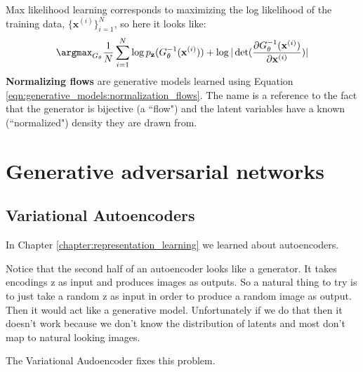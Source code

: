 Max likelihood learning corresponds to maximizing the log likelihood of the training data, $\{\mathbf{x}^{(i)}\}_{i=1}^N$, so here it looks like:
\begin{equation}
    \argmax_{G_{\theta}} \frac{1}{N} \sum_{i=1}^N \log p_{\mathbf{z}}(G_{\theta}^{-1}(\mathbf{x}^{(i)})) + \log |\det(\frac{\partial G_{\theta}^{-1}(\mathbf{x}^{(i)})}{\partial \mathbf{x}^{(i)}})|\label{eqn:generative_models:normalization_flows}
\end{equation}
{\bf Normalizing flows} are generative models learned using Equation \ref{eqn:generative_models:normalization_flows}. The name is a reference to the fact that the generator is bijective (a ``flow") and the latent variables have a known (``normalized") density they are drawn from.



\section{Generative adversarial networks}



\subsection{Variational Autoencoders}

In Chapter \ref{chapter:representation_learning} we learned about autoencoders.

Notice that the second half of an autoencoder looks like a generator. It takes encodings z as input and produces images as outputs. So a natural thing to try is to just take a random z as input in order to produce a random image as output. Then it would act like a generative model. Unfortunately if we do that then it doesn't work because we don't know the distribution of latents and most don't map to natural looking images.

The Variational Audoencoder fixes this problem.




